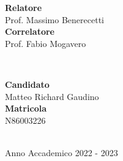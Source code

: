 \documentclass[./main.tex]{subfiles}
\begin{document}
\begin{center}
\begin{minipage}[t]{0.55\textwidth}
\begin{flushleft} \large
\textbf{Relatore}\\
Prof. Massimo Benerecetti \\[5pt]
\textbf{Correlatore}\\
Prof. Fabio Mogavero \\[5pt]
\end{flushleft}
\end{minipage}
~
\begin{minipage}[t]{0.4\textwidth}
\begin{flushright} \large
\textbf{Candidato}\\
Matteo Richard Gaudino\\[5pt]
\textbf{Matricola}\\
N86003226\\
\end{flushright}
\end{minipage}\\[0cm]

\vfill
{\large Anno Accademico 2022 - 2023}
\end{center}

\restoregeometry %
\end{document}
